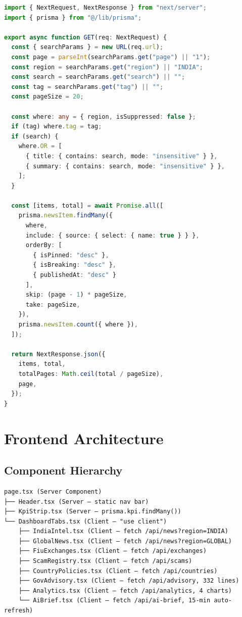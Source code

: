 \documentclass[12pt,a4paper]{article}
\begin{document}
\begin{lstlisting}[language=TypeScript,caption={src/app/api/news/route.ts}]
import { NextRequest, NextResponse } from "next/server";
import { prisma } from "@/lib/prisma";

export async function GET(req: NextRequest) {
  const { searchParams } = new URL(req.url);
  const page = parseInt(searchParams.get("page") || "1");
  const region = searchParams.get("region") || "INDIA";
  const search = searchParams.get("search") || "";
  const tag = searchParams.get("tag") || "";
  const pageSize = 20;

  const where: any = { region, isSuppressed: false };
  if (tag) where.tag = tag;
  if (search) {
    where.OR = [
      { title: { contains: search, mode: "insensitive" } },
      { summary: { contains: search, mode: "insensitive" } },
    ];
  }

  const [items, total] = await Promise.all([
    prisma.newsItem.findMany({
      where,
      include: { source: { select: { name: true } } },
      orderBy: [
        { isPinned: "desc" },
        { isBreaking: "desc" },
        { publishedAt: "desc" }
      ],
      skip: (page - 1) * pageSize,
      take: pageSize,
    }),
    prisma.newsItem.count({ where }),
  ]);

  return NextResponse.json({
    items, total,
    totalPages: Math.ceil(total / pageSize),
    page,
  });
}
\end{lstlisting}

\newpage

\section{Frontend Architecture}

\subsection{Component Hierarchy}

\begin{verbatim}
page.tsx (Server Component)
├── Header.tsx (Server — static nav bar)
├── KpiStrip.tsx (Server — prisma.kpi.findMany())
└── DashboardTabs.tsx (Client — "use client")
    ├── IndiaIntel.tsx (Client — fetch /api/news?region=INDIA)
    ├── GlobalNews.tsx (Client — fetch /api/news?region=GLOBAL)
    ├── FiuExchanges.tsx (Client — fetch /api/exchanges)
    ├── ScamRegistry.tsx (Client — fetch /api/scams)
    ├── CountryPolicies.tsx (Client — fetch /api/countries)
    ├── GovAdvisory.tsx (Client — fetch /api/advisory, 332 lines)
    ├── Analytics.tsx (Client — fetch /api/analytics, 4 charts)
    └── AiBrief.tsx (Client — fetch /api/ai-brief, 15-min auto-refresh)
\end{verbatim}
\end{document}
